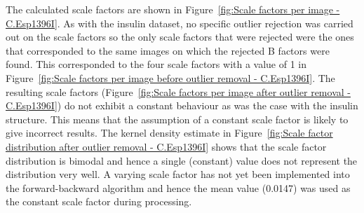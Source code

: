 The calculated scale factors are shown in Figure~\ref{fig:Scale factors per image - C.Esp1396I}.
As with the insulin dataset, no specific outlier rejection was carried out on the scale factors so the only scale factors that were rejected were the ones that corresponded to the same images on which the rejected B factors were found.
This corresponded to the four scale factors with a value of 1 in Figure~\ref{fig:Scale factors per image before outlier removal - C.Esp1396I}.
The resulting scale factors (Figure~\ref{fig:Scale factors per image after outlier removal - C.Esp1396I}) do not exhibit a constant behaviour as was the case with the insulin structure.
This means that the assumption of a constant scale factor is likely to give incorrect results.
The kernel density estimate in Figure~\ref{fig:Scale factor distribution after outlier removal - C.Esp1396I} shows that the scale factor distribution is bimodal and hence a single (constant) value does not represent the distribution very well.
A varying scale factor has not yet been implemented into the forward-backward algorithm and hence the mean value (0.0147) was used as the constant scale factor during processing.
